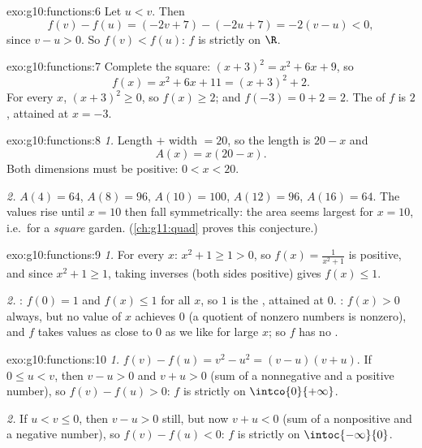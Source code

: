 \begin{solution}{exo:g10:functions:6}
Let $u < v$. Then
\[
f(v) - f(u) = (-2v + 7) - (-2u + 7) = -2(v - u) < 0,
\]
since $v - u > 0$. So $f(v) < f(u)$: $f$ is strictly  on $\R$.
\end{solution}

\begin{solution}{exo:g10:functions:7}
Complete the square: $(x+3)^2 = x^2 + 6x + 9$, so
\[
f(x) = x^2 + 6x + 11 = (x + 3)^2 + 2 .
\]
For every $x$, $(x+3)^2 \geq 0$, so $f(x) \geq 2$; and
$f(-3) = 0 + 2 = 2$. The  of $f$ is $2$, attained at $x = -3$.
\end{solution}

\begin{solution}{exo:g10:functions:8}
\emph{1.} Length $+$ width $= 20$, so the length is $20 - x$ and
\[
A(x) = x(20 - x).
\]
Both dimensions must be positive: $0 < x < 20$.

\emph{2.} $A(4) = 64$, $A(8) = 96$, $A(10) = 100$, $A(12) = 96$,
$A(16) = 64$. The values rise until $x = 10$ then fall symmetrically:
the area seems largest for $x = 10$, i.e.\ for a \emph{square} garden.
(\cref{ch:g11:quad} proves this conjecture.)
\end{solution}

\begin{solution}{exo:g10:functions:9}
\emph{1.} For every $x$: $x^2 + 1 \geq 1 > 0$, so $f(x) = \frac{1}{x^2+1}$
is positive, and since $x^2 + 1 \geq 1$, taking inverses (both sides
positive) gives $f(x) \leq 1$.

\emph{2.} : $f(0) = 1$ and $f(x) \leq 1$ for all $x$, so $1$ is the
, attained at $0$. : $f(x) > 0$ always, but no value of $x$
achieves $0$ (a quotient of nonzero numbers is nonzero), and $f$ takes
values as close to $0$ as we like for large $x$; so $f$ has no .
\end{solution}

\begin{solution}{exo:g10:functions:10}
\emph{1.} $f(v) - f(u) = v^2 - u^2 = (v-u)(v+u)$. If $0 \leq u < v$, then
$v - u > 0$ and $v + u > 0$ (sum of a nonnegative and a positive number),
so $f(v) - f(u) > 0$: $f$ is strictly  on $\intco{0}{+\infty}$.

\emph{2.} If $u < v \leq 0$, then $v - u > 0$ still, but now
$v + u < 0$ (sum of a nonpositive and a negative number), so
$f(v) - f(u) < 0$: $f$ is strictly  on $\intoc{-\infty}{0}$.
\end{solution}

